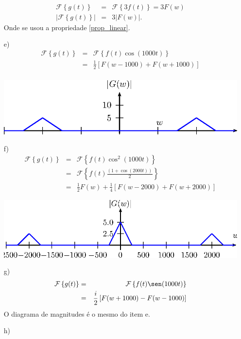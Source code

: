 \begin{resp}
\begin{itemize}
\begin{eqnarray*}
\mathcal{F}\left\{g(t)\right\}&=&\mathcal{F}\left\{3f(t)\right\}=3F\left(w\right)\\
\left|\mathcal{F}\left\{g(t)\right\}\right|&=&3\left|F\left(w\right)\right|.
\end{eqnarray*}
Onde se usou a propriedade \ref{prop_linear}.
\item[e)] 
 \begin{eqnarray*}
\mathcal{F}\left\{g(t)\right\}&=&\mathcal{F}\left\{f(t)\cos(1000t)\right\}\\
&=&\frac{1}{2}\left[F(w-1000)+F(w+1000)\right]\\
\end{eqnarray*}
\begin{center}
\includegraphics{cap_propriedades_transformada/pics/figura_16}\end{center}
\item[f)] 
\begin{eqnarray*}
\mathcal{F}\left\{g(t)\right\}&=&\mathcal{F}\left\{f(t)\cos^2(1000t)\right\}\\
&=&\mathcal{F}\left\{f(t)\frac{\left(1+\cos(2000t)\right)}{2}\right\}\\
&=&\frac{1}{2}F(w) + \frac{1}{4}\left[F(w-2000)+F(w+2000)\right]
\end{eqnarray*}
\begin{center}
\includegraphics{cap_propriedades_transformada/pics/figura_17}\end{center}
\item[g)]
\begin{eqnarray*}
\mathcal{F}\left\{g(t)\right\}&=&\mathcal{F}\left\{f(t)\sen(1000t)\right\}\\
&=&\frac{i}{2}\left[F(w+1000)-F(w-1000)\right]\\
\end{eqnarray*}
O diagrama de magnitudes é o mesmo do item e.
\item[h)] 

\end{itemize}
\end{resp}
